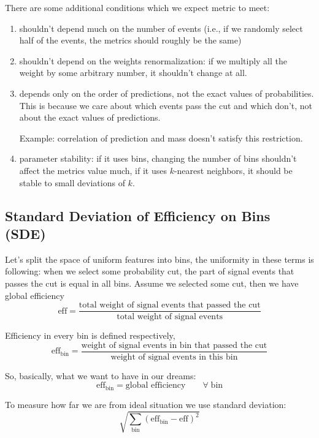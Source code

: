 There are some additional conditions which we expect metric to meet:
\begin{enumerate}
\item
shouldn't depend much on the number of events (i.e., if we randomly select half of the events, the metrics should roughly be the same)
\item
shouldn't depend on the weights renormalization: if we multiply all the weight by some arbitrary number, it shouldn't change at all.
\item 
depends only on the order of predictions, not the exact values of probabilities.
This is because we care about which events pass the cut and which don't, not about the exact values of predictions.

Example: correlation of prediction and mass doesn't satisfy this restriction.
\item
parameter stability: if it uses bins, changing the number of bins shouldn't affect the metrics value much, if it uses $k$-nearest neighbors, it should be stable to small deviations of $k$.
\end{enumerate}


\subsection{Standard Deviation of Efficiency on Bins (SDE)}

\def\bineff{\text{eff}_\text{bin}}
\def\binweight{\text{weight}_\text{bin}}
\def\globaleff{\text{eff}}
\def\SDE{\text{SDE}}
\def\bin{\text{bin}}


Let's split the space of uniform features into bins, the uniformity in these terms is following: when we select some probability cut, 
the part of signal events that passes the cut is equal in all bins. Assume we selected some cut, then we have global efficiency
\[
	\globaleff = \dfrac{
		\text{total weight of signal events that passed the cut}}
		{\text{total weight of signal events}}
\]

Efficiency in every bin is defined respectively, 
\[
	\bineff = \dfrac{
		\text{weight of signal events in bin that passed the cut}}
		{\text{weight of signal events in this bin}} 
\]

So, basically, what we want to have in our dreams:
\[
	\bineff = \text{global efficiency} \qquad \forall \; \text{bin}
\]


To measure how far we are from ideal situation we use standard deviation:
\[
	\sqrt{\sum_{\bin} \left( \bineff - \globaleff \right)^2  }
\]

